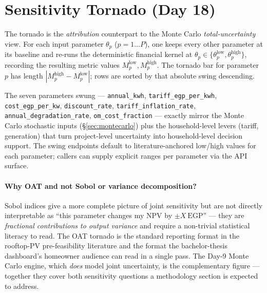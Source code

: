 \section{Sensitivity Tornado (Day 18)}
\label{sec:tornado}

The tornado is the \emph{attribution} counterpart to the Monte Carlo
\emph{total-uncertainty} view. For each input parameter $\theta_p$
($p = 1\dots P$), one keeps every other parameter at its baseline
and re-runs the deterministic financial kernel at
$\theta_p \in \{\theta_p^{\text{low}}, \theta_p^{\text{high}}\}$,
recording the resulting metric values
$M_p^{\text{low}}, M_p^{\text{high}}$. The tornado bar for parameter
$p$ has length $|M_p^{\text{high}} - M_p^{\text{low}}|$; rows are
sorted by that absolute swing descending.

The seven parameters swung --- \texttt{annual\_kwh},
\texttt{tariff\_egp\_per\_kwh}, \texttt{cost\_egp\_per\_kw},
\texttt{discount\_rate}, \texttt{tariff\_inflation\_rate},
\texttt{annual\_degradation\_rate}, \texttt{om\_cost\_fraction}
--- exactly mirror the Monte Carlo stochastic inputs
(\S\ref{sec:montecarlo}) plus the household-level levers (tariff,
generation) that turn project-level uncertainty into household-level
decision support. The swing endpoints default to literature-anchored
low/high values for each parameter; callers can supply explicit
ranges per parameter via the API surface.

\paragraph{Why OAT and not Sobol or variance decomposition?}
Sobol indices give a more complete picture of joint sensitivity but
are not directly interpretable as ``this parameter changes my NPV by
$\pm X~\mathrm{EGP}$'' --- they are \emph{fractional contributions to
output variance} and require a non-trivial statistical literacy to
read. The OAT tornado is the standard reporting format in the
rooftop-PV pre-feasibility literature
\citep{nrel-sam, ieapvps-task7} and the format the bachelor-thesis
dashboard's homeowner audience can read in a single pass. The Day-9
Monte Carlo engine, which \emph{does} model joint uncertainty, is
the complementary figure --- together they cover both sensitivity
questions a methodology section is expected to address.

